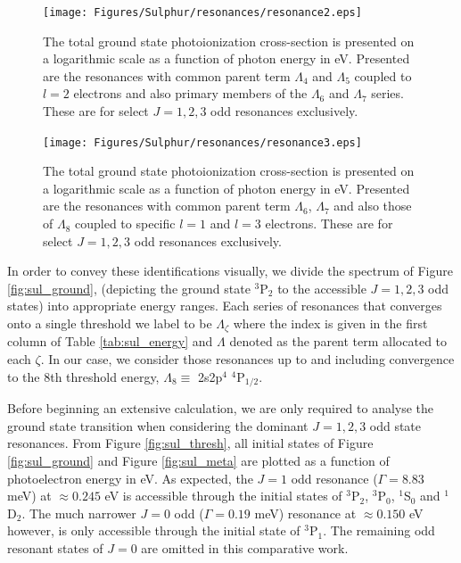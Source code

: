 %
\begin{figure}
\centering
\texttt{[image: Figures/Sulphur/resonances/resonance2.eps]}
\caption{The total ground state photoionization cross-section is presented on a logarithmic scale as a function of photon energy in eV. Presented are the resonances with common parent term $\Lambda_4$ and $\Lambda_5$ coupled to $l=2$ electrons and also primary members of the $\Lambda_6$ and $\Lambda_7$ series. These are for select $J =1,2,3$ odd resonances exclusively. \label{fig:sul_resonances2}}
\end{figure}
%

%
\begin{figure}
\centering
\texttt{[image: Figures/Sulphur/resonances/resonance3.eps]}
\caption{The total ground state photoionization cross-section is presented on a logarithmic scale as a function of photon energy in eV. Presented are the resonances with common parent term $\Lambda_6$, $\Lambda_7$ and also those of $\Lambda_8$ coupled to specific $l=1$ and $l=3$ electrons. These are for select $J =1,2,3$ odd resonances exclusively. \label{fig:sul_resonances3}}
\end{figure}
%


In order to convey these identifications visually, we divide the spectrum of Figure \ref{fig:sul_ground}, (depicting the ground state $^3$P$_2$ to the accessible $J=1, 2, 3$ odd states) into appropriate energy ranges. Each series of resonances that converges onto a single threshold we label to be $\Lambda_\zeta$ where the index is given in the first column of Table \ref{tab:sul_energy} and $\Lambda$ denoted as the parent term allocated to each $\zeta$. In our case, we consider those resonances up to and including convergence to the 8th threshold energy, $\Lambda_8 \equiv$ 2s2p$^4$ $^4$P$_{1/2}$.

Before beginning an extensive calculation, we are only required to analyse the ground state transition when considering the dominant $J=1, 2, 3$ odd state resonances. From Figure \ref{fig:sul_thresh}, all initial states of Figure \ref{fig:sul_ground} and Figure \ref{fig:sul_meta} are plotted as a function of photoelectron energy in eV. As expected, the $J = 1$ odd resonance ($\Gamma = 8.83$ meV) at $\approx 0.245$ eV is accessible through the initial states of $^3$P$_2$, $^3$P$_0$, $^1$S$_0$ and $^1$D$_2$. The much narrower $J = 0$ odd ($\Gamma = 0.19$ meV) resonance at $\approx 0.150$ eV however, is only accessible through the initial state of $^3$P$_1$. The remaining odd resonant states of $J = 0$ are omitted in this comparative work.

